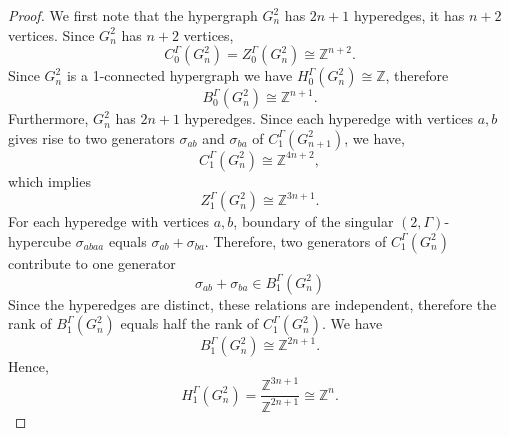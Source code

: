 \documentclass[11pt]{amsart}
\begin{document}

\begin{proof}   We first note that the hypergraph $G_n^2$ has    $2n+1$ hyperedges, it has $n+2$ vertices. Since $G_{n}^2$ has $n+2$ vertices, 
    \[C_0^\Gamma(G_{n}^2)=Z_0^\Gamma(G_{n}^2)\cong \mathbb{Z}^{n+2}. \] 
    Since $G_{n}^2$  is a 1-connected hypergraph we have $H_0^\Gamma(G_{n}^2)\cong\mathbb{Z}$, 
    therefore
            \[ B_0^\Gamma(G_{n}^2)\cong \mathbb{Z}^{n+1}.
           \]
           Furthermore, $G_{n}^2$ has $2n+1$  hyperedges. 
           Since each
hyperedge with vertices $a,b$ gives rise to two generators
$\sigma_{ab}$ and $\sigma_{ba}$ of $C_1^\Gamma(G_{n+1}^2)$, we have,
           \[ C_1^\Gamma(G_{n}^2)\cong \mathbb{Z}^{4n+2}, \] which implies \[Z_1^\Gamma(G_{n}^2)\cong \mathbb{Z}^{3n+1}.\] 
           For each hyperedge with vertices $a,b$, boundary of the singular $(2,\Gamma)$-hypercube $\sigma_{abaa}$ equals $\sigma_{ab}+\sigma_{ba}$. 
           Therefore, two generators of 
           $C_1^\Gamma(G_{n}^2)$
           contribute to one generator
           \[
           \sigma_{ab}+\sigma_{ba}\in B_1^
           \Gamma(G_{n}^2)\]
           Since the hyperedges are distinct, these
relations are independent,
           therefore the rank of
           $B_1^\Gamma(G_{n}^2)$ equals half the rank of $C_1^\Gamma(G_{n}^2)$. 
           We have \[  B_1^\Gamma(G_{n}^2)\cong \mathbb{Z}^{2n+1}.\]  
           Hence, \[H_1^\Gamma(G_{n}^2)=\frac{\mathbb{Z}^{3n+1}}{\mathbb{Z}^{2n+1}}\cong \mathbb{Z}^{n}.\]
           
           

\end{proof}
\end{document}
